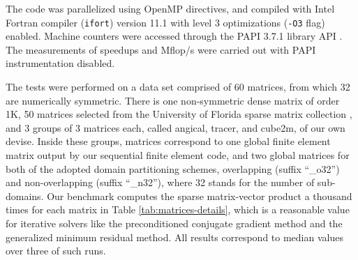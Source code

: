 \documentclass[11pt]{article}
\begin{document}
The code was parallelized using OpenMP directives, and compiled
with Intel Fortran compiler (\texttt{ifort}) version 11.1 with level 3
optimizations (\texttt{-O3} flag) enabled.  Machine counters were accessed
through the PAPI 3.7.1 library API \cite{BDGHM00a}.  The measurements of
speedups and Mflop/s were carried out with PAPI instrumentation disabled.

The tests were performed on a data set comprised of 60 matrices, from which 32 are
numerically symmetric.  There is one non-symmetric dense matrix of order 1K, 50
matrices selected from the University of Florida sparse matrix collection
\cite{Dav97a}, and 3 groups of 3 matrices each, called angical, tracer, and
cube2m, of our own devise.  Inside these groups, matrices correspond to
one global finite element matrix output by our sequential finite element code,
and two global matrices for both of the adopted domain partitioning schemes,
overlapping (suffix ``\_o32'') and non-overlapping (suffix ``\_n32''),
where 32 stands for the number of sub-domains.  Our benchmark computes the sparse
matrix-vector product a thousand times for each matrix in Table
\ref{tab:matrices-details}, which is a reasonable value for iterative solvers
like the preconditioned conjugate gradient method and the generalized
minimum residual method. All results correspond to
median values over three of such runs.
\end{document}
